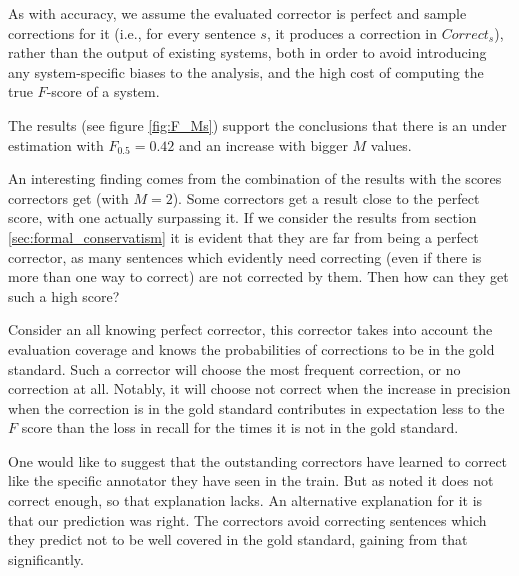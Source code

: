 		
		
		As with accuracy, we assume the evaluated corrector is perfect and sample corrections for it
		(i.e., for every sentence $s$, it produces a correction in $Correct_s$),
		rather than the output of existing systems, both
		in order to avoid introducing any system-specific biases to the analysis,
		and the high cost of computing the true $F$-score of a system.
		
		The results (see figure \ref{fig:F_Ms}) support the conclusions that there is an under estimation with $F_{0.5} = 0.42$ and an increase with bigger $M$ values.
		
		An interesting finding comes from the combination of the results with the scores correctors get (with $M=2$). Some correctors get a result close to the perfect score, with one actually surpassing it. If we consider the results from section \ref{sec:formal_conservatism} it is evident that they are far from being a perfect corrector, as many sentences which evidently need correcting (even if there is more than one way to correct) are not corrected by them. Then how can they get such a high score?
		
		Consider an all knowing perfect corrector, this corrector takes into account the evaluation coverage and knows the probabilities of corrections to be in the gold standard. Such a corrector will choose the most frequent correction, or no correction at all.  Notably, it will choose not correct when the increase in precision when the correction is in the gold standard contributes in expectation less to the $F$ score than the loss in recall for the times it is not in the gold standard.
		
		One would like to suggest that the outstanding correctors have learned to correct like the specific annotator they have seen in the train. But as noted it does not correct enough, so that explanation lacks. An alternative explanation for it is that our prediction was right. The correctors avoid correcting sentences which they predict not to be well covered in the gold standard, gaining from that significantly.
		
